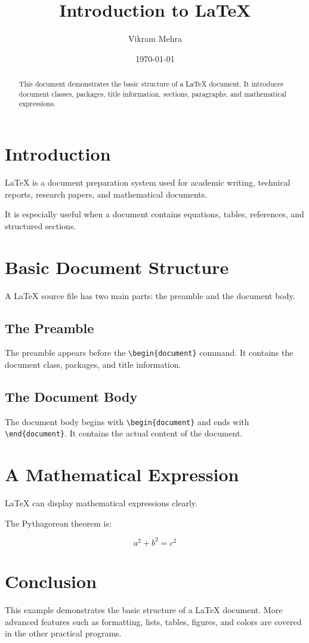 \documentclass[12pt,a4paper]{article}
\title{Introduction to LaTeX}
\author{Vikram Mehra}
\date{\today}
\begin{document}
\maketitle

\begin{abstract}
This document demonstrates the basic structure of a LaTeX document.
It introduces document classes, packages, title information,
sections, paragraphs, and mathematical expressions.
\end{abstract}

\section{Introduction}

LaTeX is a document preparation system used for academic writing,
technical reports, research papers, and mathematical documents.

It is especially useful when a document contains equations,
tables, references, and structured sections.

\section{Basic Document Structure}

A LaTeX source file has two main parts: the preamble and the document body.

\subsection{The Preamble}

The preamble appears before the \texttt{\textbackslash begin\{document\}} command.
It contains the document class, packages, and title information.

\subsection{The Document Body}

The document body begins with \texttt{\textbackslash begin\{document\}}
and ends with \texttt{\textbackslash end\{document\}}.
It contains the actual content of the document.

\section{A Mathematical Expression}

LaTeX can display mathematical expressions clearly.

The Pythagorean theorem is:

\[
a^2 + b^2 = c^2
\]

\section{Conclusion}

This example demonstrates the basic structure of a LaTeX document.
More advanced features such as formatting, lists, tables, figures,
and colors are covered in the other practical programs.
\end{document}
